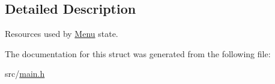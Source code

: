 \subsection{\-Detailed \-Description}
\-Resources used by \hyperlink{structMenu}{\-Menu} state. 

\-The documentation for this struct was generated from the following file\-:\begin{DoxyCompactItemize}
\item 
src/\hyperlink{main_8h}{main.\-h}\end{DoxyCompactItemize}
